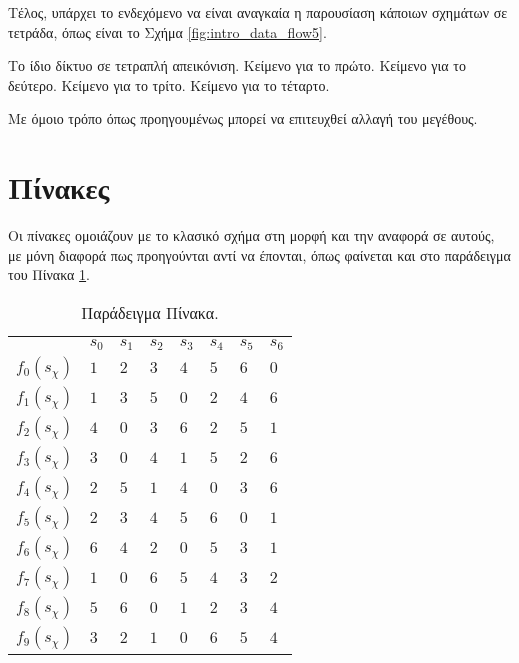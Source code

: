 Τέλος, υπάρχει το ενδεχόμενο να είναι αναγκαία 
η παρουσίαση κάποιων σχημάτων σε τετράδα,
όπως είναι το Σχήμα \ref{fig:intro_data_flow5}.

{Το ίδιο δίκτυο σε τετραπλή απεικόνιση.}
{Κείμενο για το πρώτο.}
{Κείμενο για το δεύτερο.}
{Κείμενο για το τρίτο.}
{Κείμενο για το τέταρτο.}

Με όμοιο τρόπο όπως προηγουμένως μπορεί να επιτευχθεί
αλλαγή του μεγέθους.


\section{Πίνακες}

Οι πίνακες ομοιάζουν με το κλασικό σχήμα στη μορφή και
την αναφορά σε αυτούς, με μόνη διαφορά πως προηγούνται αντί να έπονται,
όπως φαίνεται και στο παράδειγμα του Πίνακα \ref{tbl:example}.

\begin{table}
\caption{Παράδειγμα Πίνακα.}
\label{tbl:example}
\begin{center}
\begin{tabular}{|p{18mm}|p{12mm}|p{12mm}|p{12mm}|p{12mm}|p{12mm}|p{12mm}|p{12mm}|}\hline
		& 	$s_0$&	$s_1$& $s_2$	& $s_3$	& $s_4$	& $s_5$	& $s_6$	\\ \cline{1-8}
$f_0(s_\chi)$	& 	$1$	&	$2$	& $3$	& $4$	& $5$	& $6$	& $0$	\\ \cline{1-8}
$f_1(s_\chi)$	&	$1$	&	$3$	& $5$	& $0$	& $2$	& $4$	& $6$	\\ \cline{1-8}
$f_2(s_\chi)$	&	$4$	&	$0$	& $3$	& $6$	& $2$	& $5$	& $1$	\\ \cline{1-8}
$f_3(s_\chi)$	&	$3$	&	$0$	& $4$	& $1$	& $5$	& $2$	& $6$	\\ \cline{1-8}
$f_4(s_\chi)$	&	$2$	&	$5$	& $1$	& $4$	& $0$	& $3$	& $6$	\\ \cline{1-8}
$f_5(s_\chi)$	&	$2$	&	$3$	& $4$	& $5$	& $6$	& $0$	& $1$	\\ \cline{1-8}
$f_6(s_\chi)$	&	$6$	&	$4$	& $2$	& $0$	& $5$	& $3$	& $1$	\\ \cline{1-8}
$f_7(s_\chi)$	&	$1$	&	$0$	& $6$	& $5$	& $4$	& $3$	& $2$	\\ \cline{1-8}
$f_8(s_\chi)$	&	$5$	&	$6$	& $0$	& $1$	& $2$	& $3$	& $4$	\\ \cline{1-8}
$f_9(s_\chi)$	&	$3$	&	$2$	& $1$	& $0$	& $6$	& $5$	& $4$	\\ \hline
\end{tabular}
\end{center}
\end{table}
